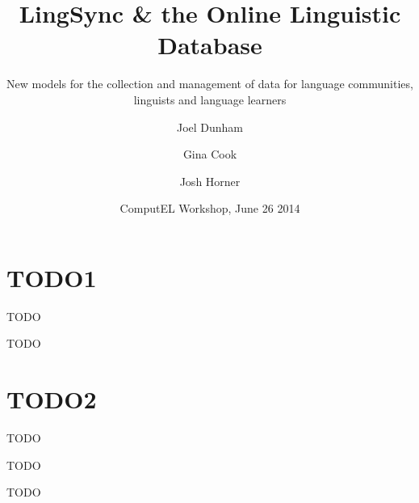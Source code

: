 \documentclass{beamer}
\begin{document}
\title[LingSync \& OLD] %
{LingSync \& the Online Linguistic Database}



\author[Dunham,Cook,Horner]{Joel Dunham  \and Gina Cook  \and Josh Horner }
                 

\subtitle
{New models for the collection and management of data for language communities, linguists and
language learners}



\date[ComputEL 2014] %
{ComputEL Workshop, June 26 2014}





\begin{frame}
  \titlepage
\end{frame}

\section{TODO1}


\begin{frame}
TODO
\end{frame}



\begin{frame}
TODO
\end{frame}

\section{TODO2}


\begin{frame}
TODO
\end{frame}



\begin{frame}
TODO
\end{frame}



\begin{frame}
TODO
\end{frame}
\end{document}
